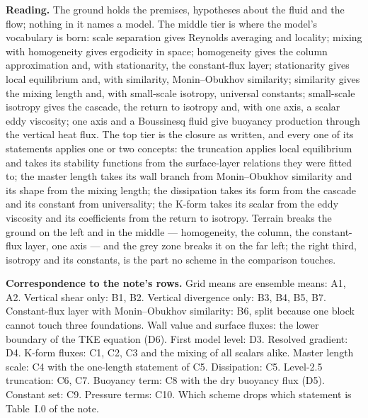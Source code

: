 \documentclass[10pt]{article}
\begin{document}
\vspace{0.4ex}
{\footnotesize\textbf{Reading.} The ground holds the premises, hypotheses about the fluid and the flow; nothing in it names a model. The middle tier is where
the model's vocabulary is born: scale separation gives Reynolds averaging and locality; mixing with homogeneity gives ergodicity in space; homogeneity gives the
column approximation and, with stationarity, the constant-flux layer; stationarity gives local equilibrium and,
with similarity, Monin--Obukhov similarity; similarity gives the mixing length and, with small-scale isotropy,
universal constants; small-scale isotropy gives the cascade, the return to isotropy and, with one axis, a scalar
eddy viscosity; one axis and a Boussinesq fluid give buoyancy production through the vertical heat flux. The top
tier is the closure as written, and every one of its statements applies one or two concepts: the truncation
applies local equilibrium and takes its stability functions from the surface-layer relations they were fitted
to; the master length takes its wall branch from Monin--Obukhov similarity and its shape from the mixing length;
the dissipation takes its form from the cascade and its constant from universality; the K-form takes its scalar
from the eddy viscosity and its coefficients from the return to isotropy. Terrain breaks the ground on the left
and in the middle --- homogeneity, the column, the constant-flux layer, one axis --- and the grey zone breaks it
on the far left; the right third, isotropy and its constants, is the part no scheme in the comparison touches.\par}

\vspace{0.5ex}
{\footnotesize\textbf{Correspondence to the note's rows.} Grid means are ensemble means: A1, A2. Vertical shear only: B1, B2. Vertical divergence only: B3, B4, B5, B7. Constant-flux layer with Monin--Obukhov similarity:
B6, split because one block cannot touch three foundations. Wall value and surface fluxes: the lower boundary of
the TKE equation (D6). First model level: D3. Resolved gradient: D4. K-form fluxes: C1, C2, C3 and the mixing of
all scalars alike. Master length scale: C4 with the one-length statement of C5. Dissipation: C5. Level-2.5
truncation: C6, C7. Buoyancy term: C8 with the dry buoyancy flux (D5). Constant set: C9. Pressure terms: C10.
Which scheme drops which statement is Table~I.0 of the note.\par}
\end{document}
